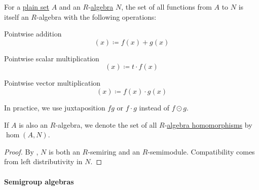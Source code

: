 \begin{proposition}\label{thm:functions_over_algebra}
  For a \hyperref[def:set]{plain set} \( A \) and an \( R \)-\hyperref[def:algebra_over_semiring]{algebra} \( N \), the set of all functions from \( A \) to \( N \) is itself an \( R \)-algebra with the following operations:
  \begin{thmenum}
     Pointwise addition
    \begin{equation*}
      [f + g](x) \coloneqq f(x) + g(x)
    \end{equation*}

     Pointwise scalar multiplication
    \begin{equation*}
      [t \cdot f](x) \coloneqq t \cdot f(x)
    \end{equation*}

     Pointwise vector multiplication
    \begin{equation*}
      [f \odot g](x) \coloneqq f(x) \cdot g(x)
    \end{equation*}

    In practice, we use juxtaposition \( fg \) or \( f \cdot g \) instead of \( f \odot g \).
  \end{thmenum}

  If \( A \) is also an \( R \)-algebra, we denote the set of all \( R \)-\hyperref[def:algebra_over_semiring/homomorphism]{algebra homomorphisms} by \( \hom(A, N) \).
\end{proposition}
\begin{proof}
  By , \( N \) is both an \( R \)-semiring and an \( R \)-semimodule. Compatibility comes from left distributivity in \( N \).
\end{proof}

\paragraph{Semigroup algebras}

